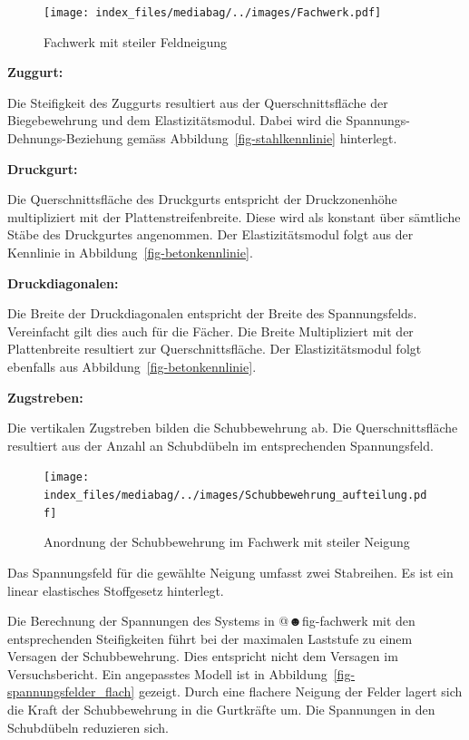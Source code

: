 \documentclass[
  letterpaper,
]{scrreprt}
\begin{document}
\begin{figure}[H]

{\centering \texttt{[image: index\_files/mediabag/../images/Fachwerk.pdf]}

}

\caption{\label{fig-fachwerk}Fachwerk mit steiler Feldneigung}

\end{figure}

\textbf{Zuggurt:}

Die Steifigkeit des Zuggurts resultiert aus der Querschnittsfläche der
Biegebewehrung und dem Elastizitätsmodul. Dabei wird die
Spannungs-Dehnungs-Beziehung gemäss Abbildung~\ref{fig-stahlkennlinie}
hinterlegt.

\textbf{Druckgurt:}

Die Querschnittsfläche des Druckgurts entspricht der Druckzonenhöhe
multipliziert mit der Plattenstreifenbreite. Diese wird als konstant
über sämtliche Stäbe des Druckgurtes angenommen. Der Elastizitätsmodul
folgt aus der Kennlinie in Abbildung~\ref{fig-betonkennlinie}.

\textbf{Druckdiagonalen:}

Die Breite der Druckdiagonalen entspricht der Breite des Spannungsfelds.
Vereinfacht gilt dies auch für die Fächer. Die Breite Multipliziert mit
der Plattenbreite resultiert zur Querschnittsfläche. Der
Elastizitätsmodul folgt ebenfalls aus
Abbildung~\ref{fig-betonkennlinie}.

\textbf{Zugstreben:}

Die vertikalen Zugstreben bilden die Schubbewehrung ab. Die
Querschnittsfläche resultiert aus der Anzahl an Schubdübeln im
entsprechenden Spannungsfeld.

\begin{figure}[H]

{\centering \texttt{[image: index\_files/mediabag/../images/Schubbewehrung\_aufteilung.pdf]}

}

\caption{\label{fig-schubbew_fw_steil}Anordnung der Schubbewehrung im
Fachwerk mit steiler Neigung}

\end{figure}

Das Spannungsfeld für die gewählte Neigung umfasst zwei Stabreihen. Es
ist ein linear elastisches Stoffgesetz hinterlegt.

Die Berechnung der Spannungen des Systems in @☻fig-fachwerk mit den
entsprechenden Steifigkeiten führt bei der maximalen Laststufe zu einem
Versagen der Schubbewehrung. Dies entspricht nicht dem Versagen im
Versuchsbericht. Ein angepasstes Modell ist in
Abbildung~\ref{fig-spannungsfelder_flach} gezeigt. Durch eine flachere
Neigung der Felder lagert sich die Kraft der Schubbewehrung in die
Gurtkräfte um. Die Spannungen in den Schubdübeln reduzieren sich.
\end{document}
